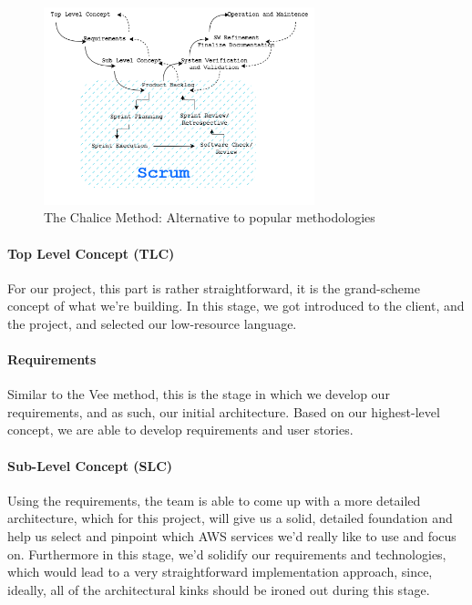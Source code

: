 \begin{figure}[h]
    \centering
    \includegraphics[width=0.7\textwidth]{images/Chalice Method (1).png}
    \caption{The Chalice Method: Alternative to popular methodologies}
    \label{fig:chalice}
\end{figure}

\paragraph*{Top Level Concept (TLC)}
For our project, this part is rather straightforward, it is the grand-scheme concept of what we're building. In this stage, we got introduced to the client, and the project, and selected our low-resource language.

\paragraph*{Requirements}
Similar to the Vee method, this is the stage in which we develop our requirements, and as such, our initial architecture. Based on our highest-level concept, we are able to develop requirements and user stories.

\paragraph*{Sub-Level Concept (SLC)}
Using the requirements, the team is able to come up with a more detailed architecture, which for this project, will give us a solid, detailed foundation and help us select and pinpoint which AWS services we'd really like to use and focus on. Furthermore in this stage, we'd solidify our requirements and technologies, which would lead to a very straightforward implementation approach, since, ideally, all of the architectural kinks should be ironed out during this stage.

